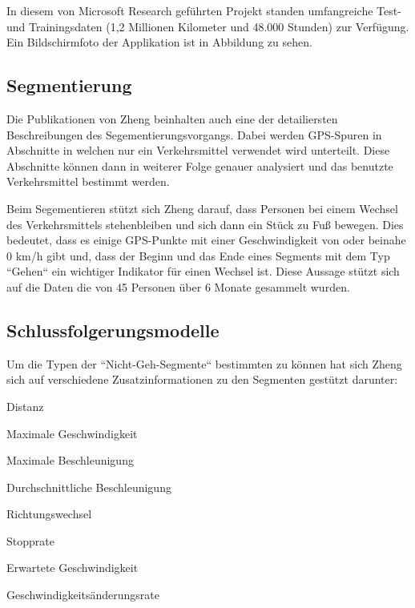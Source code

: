 In diesem von Microsoft Research geführten Projekt standen umfangreiche Test- und Trainingsdaten (1,2 Millionen Kilometer und 48.000 Stunden) zur Verfügung. \cite{microsoft_research_geolife_2015} Ein Bildschirmfoto der Applikation ist in Abbildung  zu sehen. 


\subsection{Segmentierung}
Die Publikationen von Zheng beinhalten auch eine der detailiersten Beschreibungen des Segementierungsvorgangs. Dabei werden GPS-Spuren in Abschnitte in welchen nur ein Verkehrsmittel verwendet wird unterteilt. Diese Abschnitte können dann in weiterer Folge genauer analysiert und das benutzte Verkehrsmittel bestimmt werden.

Beim Segementieren stützt sich Zheng darauf, dass Personen bei einem Wechsel des Verkehrsmittels stehenbleiben und sich dann ein Stück zu Fuß bewegen. Dies bedeutet, dass es einige GPS-Punkte mit einer Geschwindigkeit von oder beinahe 0 km/h gibt und, dass der Beginn und das Ende eines Segments mit dem Typ ``Gehen`` ein wichtiger Indikator für einen Wechsel ist. Diese Aussage stützt sich auf die Daten die von 45 Personen über 6 Monate gesammelt wurden.

\subsection{Schlussfolgerungsmodelle} \label{schlussfolgerungsmodelle}
Um die Typen der ``Nicht-Geh-Segmente`` bestimmten zu können hat sich Zheng sich auf verschiedene Zusatzinformationen zu den Segmenten gestützt darunter:

\begin{pitemize}
\item Distanz
\item Maximale Geschwindigkeit
\item Maximale Beschleunigung
\item Durchschnittliche Beschleunigung
\item Richtungswechsel
\item Stopprate
\item Erwartete Geschwindigkeit
\item Geschwindigkeitsänderungsrate
\end{pitemize}

